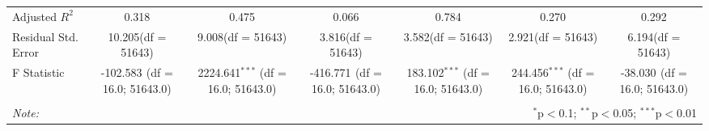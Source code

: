 \begin{table}[!htbp]
\begin{tabular}{@{\extracolsep{5pt}}lcccccc}
 Adjusted $R^2$ & 0.318 & 0.475 & 0.066 & 0.784 & 0.270 & 0.292 \\
 Residual Std. Error & 10.205(df = 51643) & 9.008(df = 51643) & 3.816(df = 51643) & 3.582(df = 51643) & 2.921(df = 51643) & 6.194(df = 51643)  \\
 F Statistic & -102.583$^{}$ (df = 16.0; 51643.0) & 2224.641$^{***}$ (df = 16.0; 51643.0) & -416.771$^{}$ (df = 16.0; 51643.0) & 183.102$^{***}$ (df = 16.0; 51643.0) & 244.456$^{***}$ (df = 16.0; 51643.0) & -38.030$^{}$ (df = 16.0; 51643.0) \\
\hline
\hline \\[-1.8ex]
\textit{Note:} & \multicolumn{6}{r}{$^{*}$p$<$0.1; $^{**}$p$<$0.05; $^{***}$p$<$0.01} \\
\end{tabular}
\end{table}